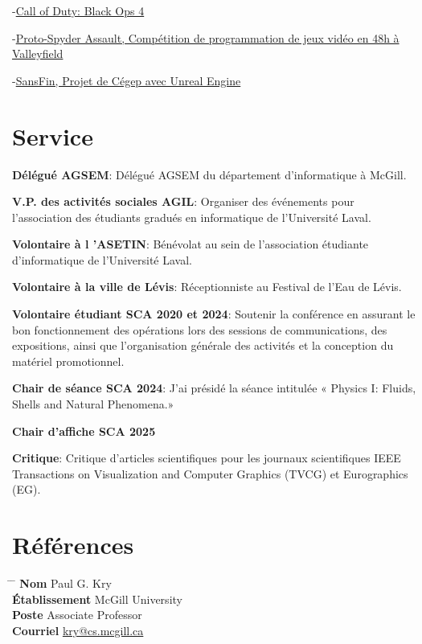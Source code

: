 \documentclass[10pt]{article} %
\begin{document}
{
-\href{https://www.callofduty.com/ca/en/blackops4}{Call of Duty: Black Ops 4}

-\href{https://youtu.be/qJjy8b0kuSY}{Proto-Spyder Assault, Compétition de programmation de jeux vidéo en 48h à Valleyfield}

-\href{https://youtu.be/s6vr07Nt1IY}{SansFin, Projet de Cégep avec Unreal Engine}
}

\section{Service}
\textbf{Délégué AGSEM}: Délégué AGSEM du département d'informatique à McGill.

\noindent\textbf{V.P. des activités sociales AGIL}: Organiser des événements pour l'association des étudiants gradués en informatique de l'Université Laval.

\noindent\textbf{Volontaire à l 'ASETIN}: Bénévolat au sein de l'association étudiante d'informatique de l'Université Laval.

\noindent\textbf{Volontaire à la ville de Lévis}: Réceptionniste au Festival de l'Eau de Lévis.

\noindent\textbf{Volontaire étudiant SCA 2020 et 2024}: Soutenir la conférence en assurant le bon fonctionnement des opérations lors des
sessions de communications, des expositions, ainsi que l'organisation générale des activités et la conception du matériel promotionnel.

\noindent\textbf{Chair de séance SCA 2024}: J'ai présidé la séance intitulée « Physics I: Fluids, Shells and Natural Phenomena.»

\noindent\textbf{Chair d'affiche SCA 2025}

\noindent\textbf{Critique}: Critique d'articles scientifiques pour les journaux scientifiques IEEE Transactions on Visualization and Computer Graphics (TVCG) et Eurographics (EG).


\section{Références}

\parbox{0.5\textwidth}{
\begin{tabbing}
\hspace{2.75cm} \= \hspace{4cm} \= \kill
{\bf Nom} \> Paul G. Kry\\ 
{\bf Établissement} \> McGill University\\ 
{\bf Poste} \> Associate Professor \\ 
{\bf Courriel} \> \href{mailto:kry@cs.mcgill.ca}{kry@cs.mcgill.ca}
\end{tabbing}}
\end{document}
